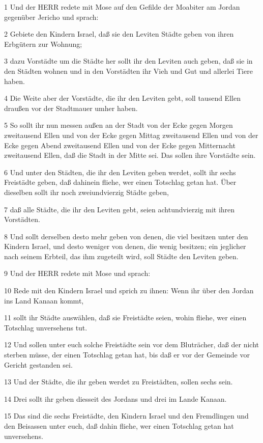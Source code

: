 \par 1 Und der HERR redete mit Mose auf den Gefilde der Moabiter am Jordan gegenüber Jericho und sprach:
\par 2 Gebiete den Kindern Israel, daß sie den Leviten Städte geben von ihren Erbgütern zur Wohnung;
\par 3 dazu Vorstädte um die Städte her sollt ihr den Leviten auch geben, daß sie in den Städten wohnen und in den Vorstädten ihr Vieh und Gut und allerlei Tiere haben.
\par 4 Die Weite aber der Vorstädte, die ihr den Leviten gebt, soll tausend Ellen draußen vor der Stadtmauer umher haben.
\par 5 So sollt ihr nun messen außen an der Stadt von der Ecke gegen Morgen zweitausend Ellen und von der Ecke gegen Mittag zweitausend Ellen und von der Ecke gegen Abend zweitausend Ellen und von der Ecke gegen Mitternacht zweitausend Ellen, daß die Stadt in der Mitte sei. Das sollen ihre Vorstädte sein.
\par 6 Und unter den Städten, die ihr den Leviten geben werdet, sollt ihr sechs Freistädte geben, daß dahinein fliehe, wer einen Totschlag getan hat. Über dieselben sollt ihr noch zweiundvierzig Städte geben,
\par 7 daß alle Städte, die ihr den Leviten gebt, seien achtundvierzig mit ihren Vorstädten.
\par 8 Und sollt derselben desto mehr geben von denen, die viel besitzen unter den Kindern Israel, und desto weniger von denen, die wenig besitzen; ein jeglicher nach seinem Erbteil, das ihm zugeteilt wird, soll Städte den Leviten geben.
\par 9 Und der HERR redete mit Mose und sprach:
\par 10 Rede mit den Kindern Israel und sprich zu ihnen: Wenn ihr über den Jordan ins Land Kanaan kommt,
\par 11 sollt ihr Städte auswählen, daß sie Freistädte seien, wohin fliehe, wer einen Totschlag unversehens tut.
\par 12 Und sollen unter euch solche Freistädte sein vor dem Bluträcher, daß der nicht sterben müsse, der einen Totschlag getan hat, bis daß er vor der Gemeinde vor Gericht gestanden sei.
\par 13 Und der Städte, die ihr geben werdet zu Freistädten, sollen sechs sein.
\par 14 Drei sollt ihr geben diesseit des Jordans und drei im Lande Kanaan.
\par 15 Das sind die sechs Freistädte, den Kindern Israel und den Fremdlingen und den Beisassen unter euch, daß dahin fliehe, wer einen Totschlag getan hat unversehens.
